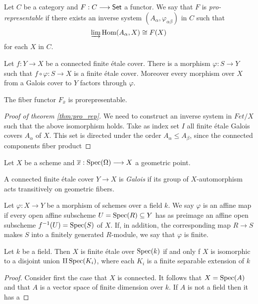 \begin{definition}
  Let $C$ be a category and $F: C \longrightarrow \mathsf{Set}$ a functor. We say that $F$ is \textit{pro-representable} if there exists an \Gls{inverse system} $(A_\alpha,\varphi_{\alpha \beta})$ in $C$ such that 
  \[
    \varinjlim \operatorname{Hom}(A_\alpha, X) \cong F(X)
    \]
  for each $X$ in $C$.
\end{definition}
\begin{lemma}
  Let $f: Y \to X$ be a connected finite \'etale cover. There is a morphism $\varphi: S \to Y$ such that $f \circ \varphi: S \to X$ is a finite \'etale cover. Moreover every morphism over $X$ from a Galois cover to $Y$ factors through $\varphi$.
\end{lemma}

\begin{theorem}\label{thm:pro_rep}
  The fiber functor $F_{\overline{x}}$ is prorepresentable.
\end{theorem}
\begin{proof}[Proof of theorem \ref{thm:pro_rep}]
  We need to construct an inverse system in $Fet/X$ such that the above isomorphism holds. Take as index set $I$ all finite \'etale Galois covers $A_\alpha$ of $X$. This set is directed under the order $A_\alpha \le A_\beta$, since the connected components fiber product
\end{proof}

\begin{theorem}
  Let $X$ be a scheme and $\overline{x} : \operatorname{Spec}(\Omega) \longrightarrow X$ a geometric point.
\end{theorem}

\begin{definition}
  A connected finite \'etale cover $Y \to X$ is \textit{Galois} if its group of $X$-automorphism acts transitively on geometric fibers.
\end{definition}


\begin{definition}
  Let $\varphi: X \to Y$ be a morphism of schemes over a field $k$. We say $\varphi$ is an affine map if every open affine subscheme $U = \operatorname{Spec}(R) \subseteq Y$ has as preimage an affine open subscheme $f^{-1}(U) = \operatorname{Spec}(S)$ of $X$. If, in addition, the corresponding map $R \to S$ makes $S$ into a finitely generated $R$-module, we say that $\varphi$ is finite.
\end{definition}

\begin{proposition}
Let $k$ be a field. Then $X$ is finite \'etale over $\operatorname{Spec}(k)$ if and only f $X$ is isomorphic to a disjoint union $\amalg \operatorname{Spec}(K_i)$, where each $K_i$ is a finite separable extension of $k$
\end{proposition}
\begin{proof}
  Consider first the case that $X$ is connected. It follows that $X = \operatorname{Spec}(A)$ and that $A$ is a vector space of finite dimension over $k$. If $A$ is not a field then it has a
\end{proof}




